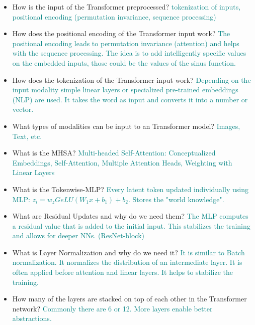\documentclass{report}
\newcommand{\asw}[2][teal]{}
\renewcommand{\asw}[2][teal]{\textcolor{#1}{#2}}
\begin{document}
\begin{itemize}
{		\newline both $\rightarrow$ e.g. TS (translation)}
		\item How is the input of the Transformer preprocessed?
		\asw{\newline tokenization of inputs, positional encoding (permutation invariance, sequence processing)}
		\item How does the positional encoding of the Transformer input work?
		\asw{\newline The positional encoding leads to permutation invariance (attention) and helps with the sequence processing. The idea is to add intelligently specific values on the embedded inputs, those could be the values of the sinus function.}
		\item How does the tokenization of the Transformer input work?
		\asw{\newline Depending on the input modality simple linear layers or specialized pre-trained embeddings (NLP) are used. It takes the word as input and converts it into a number or vector.}
		\item What types of modalities can be input to an Transformer model?
		\asw{\newline Images, Text, etc.}
		\item What is the MHSA?
		\asw{\newline Multi-headed Self-Attention: Conceptualized Embeddings, Self-Attention, Multiple Attention Heads, Weighting with Linear Layers}
		\item What is the Tokenwise-MLP?
		\asw{\newline Every latent token updated individually using MLP: $z_i = w_z GeLU(W_1 x + b_1) + b_2$. Stores the "world knowledge".}
		\item What are Residual Updates and why do we need them?
		\asw{\newline The MLP computes a residual value that is added to the initial input. This stabilizes the training and allows for deeper NNs. (ResNet-block)}
		\item What is Layer Normalization and why do we need it?
		\asw{\newline It is similar to Batch normalization. It normalizes the distribution of an intermediate layer. It is often applied before attention and linear layers. It helps to stabilize the training.}
		\item How many of the layers are stacked on top of each other in the Transformer network?
		\asw{\newline Commonly there are 6 or 12. More layers enable better abstractions.}

\end{itemize}
\end{document}
